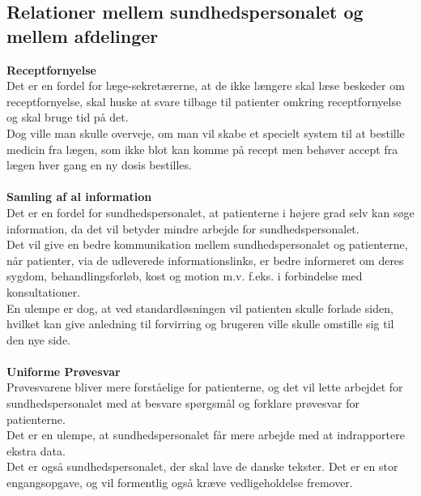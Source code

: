 \subsection{Relationer mellem sundhedspersonalet og mellem afdelinger}
\textbf{Receptfornyelse}\\
Det er en fordel for læge-sekretærerne, at de ikke længere skal læse beskeder om receptfornyelse, skal huske at svare tilbage til patienter omkring receptfornyelse og skal bruge tid på det.\\
Dog ville man skulle overveje, om man vil skabe et specielt system til at bestille medicin fra lægen, som ikke blot kan komme på recept men behøver accept fra lægen hver gang en ny dosis bestilles. 
\\\\
\textbf{Samling af al information}\\
Det er en fordel for sundhedspersonalet, at patienterne i højere grad selv kan søge information, da det vil betyder mindre arbejde for sundhedspersonalet.\\
Det vil give en bedre kommunikation mellem sundhedspersonalet og patienterne, når patienter, via de udleverede informationslinks, er bedre informeret om deres sygdom, behandlingsforløb, kost og motion m.v. f.eks. i forbindelse med konsultationer.\\
En ulempe er dog, at ved standardløsningen vil patienten skulle forlade siden, hvilket kan give anledning til forvirring og brugeren ville skulle omstille sig til den nye side. 
\\\\
\textbf{Uniforme Prøvesvar}\\
Prøvesvarene bliver mere forståelige for patienterne, og det vil lette arbejdet for sundhedspersonalet med at besvare spørgsmål og forklare prøvesvar for patienterne.\\
Det er en ulempe, at sundhedspersonalet får mere arbejde med at indrapportere ekstra data. \\
Det er også sundhedspersonalet, der skal lave de danske tekster. Det er en stor engangsopgave, og vil formentlig også kræve vedligeholdelse fremover.
